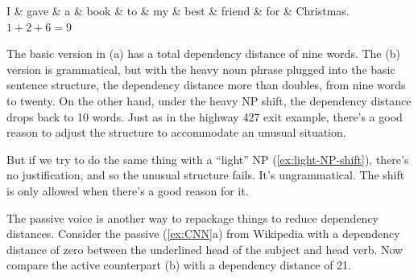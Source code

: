 \ea \label{ex:book-dep-dist-long}
    \ea
        \begin{dependency}[theme = simple, arc angle=40]
           \begin{deptext}[column sep=0.1em, row sep=0.5cm]
              I \& gave \& a \& book \& to \& my \& best \& friend \& for \& Christmas.~~~$1+2+6=9$\\
           \end{deptext}
        \end{dependency}
    \z
\z

The basic version in (a) has a total dependency distance of nine words. The (b) version is grammatical, but with the heavy noun phrase plugged into the basic sentence structure, the dependency distance more than doubles, from nine words to twenty. On the other hand, under the heavy NP shift, the dependency distance drops back to 10 words. Just as in the highway 427 exit example, there's a good reason to adjust the structure to accommodate an unusual situation.

But if we try to do the same thing with a \enquote{light} NP (\ref{ex:light-NP-shift}), there's no justification, and so the unusual structure fails. It's ungrammatical. The shift is only allowed when there's a good reason for it.

\label{ex:light-NP-shift}\z

The passive voice is another way to repackage things to reduce dependency distances. Consider the passive (\ref{ex:CNN}a) from Wikipedia with a dependency distance of zero between the underlined head of the subject and head verb. Now compare the active counterpart (b) with a dependency distance of 21.

